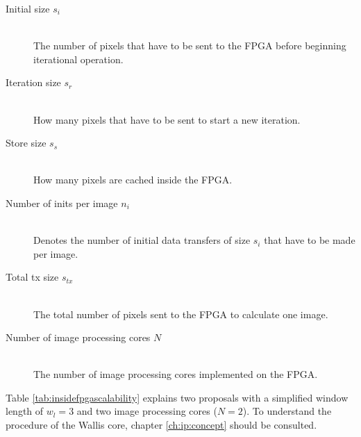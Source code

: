 \begin{description}
    \item[Initial size $s_i$]\hfill \\
    The number of pixels that have to be sent to the FPGA before beginning
    iterational operation.
    \item[Iteration size $s_r$]\hfill \\
    How many pixels that have to be sent to start a new iteration.
    \item[Store size $s_s$]\hfill \\
    How many pixels are cached inside the FPGA.
    \item[Number of inits per image $n_i$]\hfill \\
    Denotes the number of initial data transfers of size $s_i$ that have to be
    made per image.
    \item[Total tx size $s_{tx}$]\hfill \\
    The total number of pixels sent to the FPGA to calculate one image.
    \item[Number of image processing cores $N$]\hfill \\
    The number of image processing cores implemented on the FPGA.
\end{description}

Table \ref{tab:insidefpgascalability} explains two proposals with a simplified
window length of $w_l=3$ and two image processing cores ($N=2$). To understand
the procedure of the Wallis core, chapter \ref{ch:ip:concept} should be
consulted.

